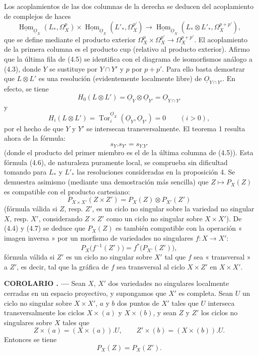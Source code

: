 \documentclass[11pt,twoside,openany]{book}
\numberwithin{equation}{section}
\newcommand{\src}[1]{%
  \phantomsection\hypertarget{src:#1}{}%
  \marginpar{\raggedleft\footnotesize\sffamily #1}%
}
\newcommand{\Osh}{\underline{O}}
\newcommand{\Homsh}{\underline{\operatorname{Hom}}}
\theoremstyle{plain}
\theoremstyle{definition}
\theoremstyle{remark}
\newcommand{\result}[2]{%
  \par\medskip\noindent\textbf{#1%
  \if\relax\detokenize{#2}\relax\else\space#2\fi. ---}\enspace
}
\newcommand{\FgaUnitKey}{frontmatter}
\renewcommand{\src}[1]{%
  \phantomsection\hypertarget{src:\FgaUnitKey:#1}{}%
  \marginpar{\raggedleft\footnotesize\sffamily #1}%
}
\theoremstyle{plain}
\theoremstyle{definition}
\theoremstyle{remark}
\begin{document}
\src{180}
Los acoplamientos de las dos columnas de la derecha se deducen del acoplamiento de
complejos de haces
\[
\Homsh_{\Osh_X}(L_{*},\Omega_X^{p})
\times\Homsh_{\Osh_X}(L'_{*},\Omega_X^{p'})
\longrightarrow
\Homsh_{\Osh_X}(L_{*}\otimes L'_{*},\Omega_X^{p+p'}),
\]
que se define mediante el producto exterior
$\Omega_X^{p}\times\Omega_X^{p'}\longrightarrow\Omega_X^{p+p'}$.
El acoplamiento de la primera columna es el producto cup (relativo al producto
exterior). Afirmo que la última fila de (4.5) se identifica con el diagrama
de isomorfismos análogo a (4.3), donde $Y$ se sustituye por $Y\cap Y'$ y $p$ por
$p+p'$. Para ello basta demostrar que $L\otimes L'$ es una resolución
(evidentemente localmente libre) de $\Osh_{Y\cap Y'}$. En efecto, se tiene
\[
  H_0(L\otimes L')=\Osh_Y\otimes\Osh_{Y'}=\Osh_{Y\cap Y'}
\]
y
\[
  H_i(L\otimes L')=\operatorname{Tor}_{i}^{\Osh_X}(\Osh_Y,\Osh_{Y'})=0
  \qquad(i>0),
\]
por el hecho de que $Y$ y $Y'$ se intersecan transversalmente. El teorema 1 resulta
ahora de la fórmula:
\begin{equation}\tag{4.6}
  s_Y.s_{Y'}=s_{Y.Y'}
\end{equation}
(donde el producto del primer miembro es el de la última columna de (4.5)).
Esta fórmula (4.6), de naturaleza puramente local, se comprueba sin dificultad
tomando para $L_{*}$ y $L'_{*}$ las resoluciones consideradas en la proposición
4. Se demuestra asimismo (mediante una demostración más sencilla) que
$Z\longmapsto P_X(Z)$ es compatible con el producto cartesiano:
\begin{equation}\tag{4.7}
  P_{X\times X'}(Z\times Z')=P_X(Z)\otimes P_{X'}(Z')
\end{equation}
(fórmula válida si $Z$, resp. $Z'$, es un ciclo no singular sobre la variedad
no singular $X$, resp. $X'$, considerando $Z\times Z'$ como un ciclo no
singular sobre $X\times X'$). De (4.4) y (4.7) se deduce que $P_X(Z)$ es también
compatible con la operación « imagen inversa » por un morfismo de variedades no
singulares $f:X\longrightarrow X'$:
\begin{equation}\tag{4.8}
  P_X\bigl(f^{-1}(Z')\bigr)=f^{*}\bigl(P_{X'}(Z')\bigr),
\end{equation}
fórmula válida si $Z'$ es un ciclo no singular sobre $X'$ tal que $f$ sea
« transversal » a $Z'$, es decir, tal que la gráfica de $f$ sea transversal al ciclo
$X\times Z'$ en $X\times X'$.

\src{181}
\result{COROLARIO}{1} Sean $X$, $X'$ dos variedades no singulares
localmente cerradas en un espacio proyectivo, y supongamos que $X'$ es completa. Sean $U$
un ciclo no singular sobre $X\times X'$, $a$ y $b$ dos puntos de $X'$ tales que
$U$ interseca transversalmente los ciclos $X\times(a)$ y $X\times(b)$, y sean $Z$
y $Z'$ los ciclos no singulares sobre $X$ tales que
\[
  Z\times(a)=(X\times(a)).U,
  \qquad
  Z'\times(b)=(X\times(b)).U.
\]
Entonces se tiene
\[
  P_X(Z)=P_X(Z').
\]
\end{document}

